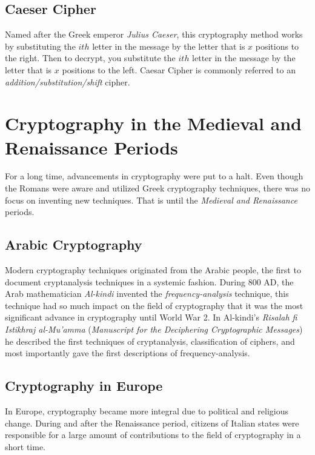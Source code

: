 \subsection{Caeser Cipher}

Named after the Greek emperor \textit{Julius Caeser}, this cryptography method works by substituting the $ith$ letter in the 
message by the letter that is $x$ positions to the right. Then to decrypt, you substitute the $ith$ letter in the message by 
the letter that is $x$ positions to the left. Caesar Cipher is commonly referred to an \textit{addition/substitution/shift} 
cipher.

\section{Cryptography in the Medieval and Renaissance Periods}

For a long time, advancements in cryptography were put to a halt. Even though the Romans were aware and utilized Greek 
cryptography techniques, there was no focus on inventing new techniques. That is until the \textit{Medieval and Renaissance}
periods.

\subsection{Arabic Cryptography}

Modern cryptography techniques originated from the Arabic people, the first to document cryptanalysis techniques 
in a systemic fashion. During 800 AD, the Arab mathematician \textit{Al-kindi} invented the \textit{frequency-analysis} 
technique, this technique had so much impact on the field of cryptography that it was the most significant advance in
cryptography until World War 2. In Al-kindi's \textit{Risalah fi Istikhraj al-Mu'amma} 
(\textit{Manuscript for the Deciphering Cryptographic Messages}) he described the first techniques of cryptanalysis,
classification of ciphers, and most importantly gave the first descriptions of frequency-analysis.

\subsection{Cryptography in Europe}

In Europe, cryptography became more integral due to political and religious change. During and after the Renaissance period,
citizens of Italian states were responsible for a large amount of contributions to the field of cryptography in a short time.
